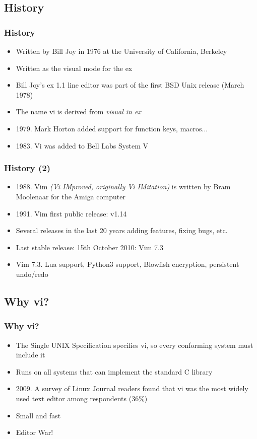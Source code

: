 \documentclass{beamer}
\begin{document}
\subsection{History}
\begin{frame}
\frametitle{History}

\begin{itemize}
\item Written by Bill Joy in 1976 at the University of California, Berkeley
\item Written as the visual mode for the ex
\item Bill Joy's ex 1.1 line editor was part of the first BSD Unix release (March 1978)
\item The name vi is derived from \textit{visual in ex}
\item 1979. Mark Horton added support for function keys, macros...
\item 1983. Vi was added to Bell Labs System V
\end{itemize}
\end{frame}

\begin{frame}
\frametitle{History (2)}
\begin{itemize}
\item 1988. Vim \textit{(Vi IMproved, originally Vi IMitation)} is written by Bram Moolenaar for the Amiga computer
\item 1991. Vim first public release: v1.14
\item Several releases in the last 20 years adding features, fixing bugs, etc.
\item Last stable release: 15th October 2010: Vim 7.3
\item Vim 7.3. Lua support, Python3 support, Blowfish encryption, persistent undo/redo
\end{itemize}

\end{frame}


\subsection{Why vi?}
\begin{frame}
\frametitle{Why vi?}

\begin{itemize}
\item The Single UNIX Specification specifies vi, so every conforming system must include it
\item Runs on all systems that can implement the standard C library
\item 2009. A survey of Linux Journal readers found that vi was the most widely used text editor among respondents (36\%)
\item Small and fast
\item Editor War!
\end{itemize}

\end{frame}
\end{document}
